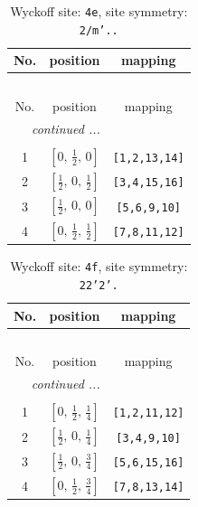 \documentclass[fleqn,8pt]{jsarticle}
\begin{document}
\begin{longtable}{ccc}
\caption{Wyckoff site: {\tt 4e}, site symmetry: {\tt 2/m'..}}
 \\
 \hline \hline
No. & position & mapping \\ \hline \endfirsthead

\multicolumn{2}{l}{\tablename\ \thetable{}} \\
 \hline \hline
No. & position & mapping \\ \hline \endhead

 \hline \hline
\multicolumn{2}{r}{\footnotesize\it continued ...} \\ \endfoot

 \hline \hline
\multicolumn{2}{r}{} \\ \endlastfoot

1 & $\left[ 0,\, \frac{1}{2},\, 0 \right]$ & {\tt [1,2,13,14]} \\ \hline
2 & $\left[ \frac{1}{2},\, 0,\, \frac{1}{2} \right]$ & {\tt [3,4,15,16]} \\ \hline
3 & $\left[ \frac{1}{2},\, 0,\, 0 \right]$ & {\tt [5,6,9,10]} \\ \hline
4 & $\left[ 0,\, \frac{1}{2},\, \frac{1}{2} \right]$ & {\tt [7,8,11,12]} \\
\end{longtable}
\renewcommand{\arraystretch}{1.2}
\begin{longtable}{ccc}
\caption{Wyckoff site: {\tt 4f}, site symmetry: {\tt 22'2'.}}
 \\
 \hline \hline
No. & position & mapping \\ \hline \endfirsthead

\multicolumn{2}{l}{\tablename\ \thetable{}} \\
 \hline \hline
No. & position & mapping \\ \hline \endhead

 \hline \hline
\multicolumn{2}{r}{\footnotesize\it continued ...} \\ \endfoot

 \hline \hline
\multicolumn{2}{r}{} \\ \endlastfoot

1 & $\left[ 0,\, \frac{1}{2},\, \frac{1}{4} \right]$ & {\tt [1,2,11,12]} \\ \hline
2 & $\left[ \frac{1}{2},\, 0,\, \frac{1}{4} \right]$ & {\tt [3,4,9,10]} \\ \hline
3 & $\left[ \frac{1}{2},\, 0,\, \frac{3}{4} \right]$ & {\tt [5,6,15,16]} \\ \hline
4 & $\left[ 0,\, \frac{1}{2},\, \frac{3}{4} \right]$ & {\tt [7,8,13,14]} \\
\end{longtable}
\end{document}
